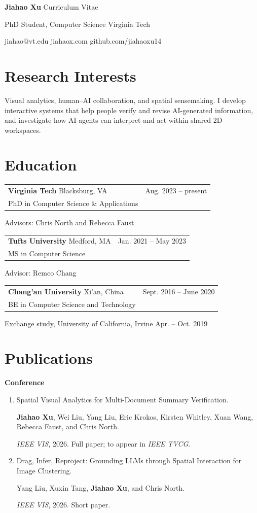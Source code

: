 \documentclass[11pt,letterpaper]{article}
\makeatletter
\newcommand{\cventry}[4]{%
  \begin{tabularx}{\linewidth}{@{}Xr@{}}
    \textbf{#1} {\small\color{secondary}\enspace\textperiodcentered\enspace #2} & {\small #4} \\
    #3 & {}
  \end{tabularx}\par
}
\makeatother
\begin{document}
{\fontsize{27}{30}\selectfont\bfseries Jiahao Xu}\hfill
{\small\color{secondary} Curriculum Vitae}\par
\vspace{5pt}
PhD Student, Computer Science \textbar{} Virginia Tech\par
\vspace{3pt}
{\small
  jiahao@vt.edu \enspace\textbar{}\enspace
  jiahaox.com \enspace\textbar{}\enspace
  github.com/jiahaoxu14}\par

\section*{Research Interests}
Visual analytics, human--AI collaboration, and spatial sensemaking.
I develop interactive systems that help people verify and revise AI-generated
information, and investigate how AI agents can interpret and act within shared
2D workspaces.

\section*{Education}
\cventry{Virginia Tech}{Blacksburg, VA}
  {PhD in Computer Science \& Applications}{Aug. 2023 -- present}
{\small Advisors: Chris North and Rebecca Faust}\par
\vspace{4pt}

\cventry{Tufts University}{Medford, MA}
  {MS in Computer Science}{Jan. 2021 -- May 2023}
{\small Advisor: Remco Chang}\par
\vspace{4pt}

\cventry{Chang'an University}{Xi'an, China}
  {BE in Computer Science and Technology}{Sept. 2016 -- June 2020}
{\small Exchange study, University of California, Irvine \hfill Apr. -- Oct. 2019}

\section*{Publications}
{\small\bfseries Conference\par}
\begin{enumerate}
  \item Spatial Visual Analytics for
    Multi-Document Summary Verification.\par
    {\small \textbf{Jiahao Xu}, Wei Liu, Yang Liu, Eric Krokos, Kirsten Whitley,
    Xuan Wang, Rebecca Faust, and Chris North.\par}
    {\small \textit{IEEE VIS}, 2026. Full paper; to appear in \textit{IEEE TVCG}.\par}

  \item Drag, Infer, Reproject: Grounding
    LLMs through Spatial Interaction for Image Clustering.\par
    {\small Yang Liu, Xuxin Tang, \textbf{Jiahao Xu}, and Chris North.\par}
    {\small \textit{IEEE VIS}, 2026. Short paper.\par}
\end{enumerate}
\end{document}
